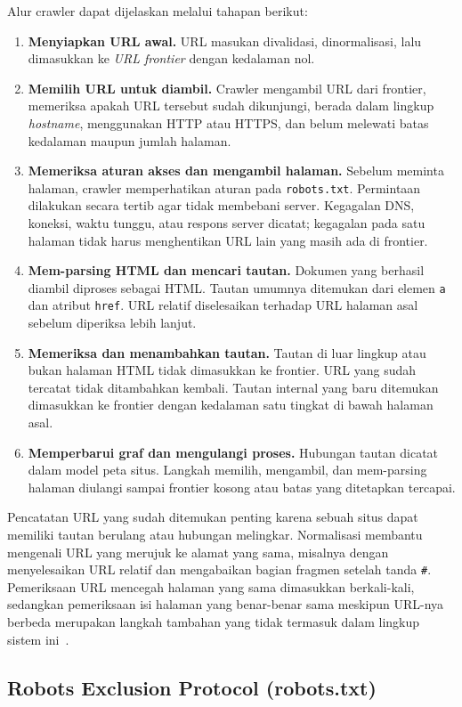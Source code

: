 Alur crawler dapat dijelaskan melalui tahapan berikut:
\begin{enumerate}
    \item \textbf{Menyiapkan URL awal.} URL masukan divalidasi, dinormalisasi, lalu dimasukkan ke \textit{URL frontier} dengan kedalaman nol.
    \item \textbf{Memilih URL untuk diambil.} Crawler mengambil URL dari frontier, memeriksa apakah URL tersebut sudah dikunjungi, berada dalam lingkup \textit{hostname}, menggunakan HTTP atau HTTPS, dan belum melewati batas kedalaman maupun jumlah halaman.
    \item \textbf{Memeriksa aturan akses dan mengambil halaman.} Sebelum meminta halaman, crawler memperhatikan aturan pada \texttt{robots.txt}. Permintaan dilakukan secara tertib agar tidak membebani server. Kegagalan DNS, koneksi, waktu tunggu, atau respons server dicatat; kegagalan pada satu halaman tidak harus menghentikan URL lain yang masih ada di frontier.
    \item \textbf{Mem-parsing HTML dan mencari tautan.} Dokumen yang berhasil diambil diproses sebagai HTML. Tautan umumnya ditemukan dari elemen \texttt{a} dan atribut \texttt{href}. URL relatif diselesaikan terhadap URL halaman asal sebelum diperiksa lebih lanjut.
    \item \textbf{Memeriksa dan menambahkan tautan.} Tautan di luar lingkup atau bukan halaman HTML tidak dimasukkan ke frontier. URL yang sudah tercatat tidak ditambahkan kembali. Tautan internal yang baru ditemukan dimasukkan ke frontier dengan kedalaman satu tingkat di bawah halaman asal.
    \item \textbf{Memperbarui graf dan mengulangi proses.} Hubungan tautan dicatat dalam model peta situs. Langkah memilih, mengambil, dan mem-parsing halaman diulangi sampai frontier kosong atau batas yang ditetapkan tercapai.
\end{enumerate}

Pencatatan URL yang sudah ditemukan penting karena sebuah situs dapat memiliki tautan berulang atau hubungan melingkar. Normalisasi membantu mengenali URL yang merujuk ke alamat yang sama, misalnya dengan menyelesaikan URL relatif dan mengabaikan bagian fragmen setelah tanda \texttt{\#}. Pemeriksaan URL mencegah halaman yang sama dimasukkan berkali-kali, sedangkan pemeriksaan isi halaman yang benar-benar sama meskipun URL-nya berbeda merupakan langkah tambahan yang tidak termasuk dalam lingkup sistem ini~\cite{manning:08:introir}.

\subsection{Robots Exclusion Protocol (robots.txt)}

